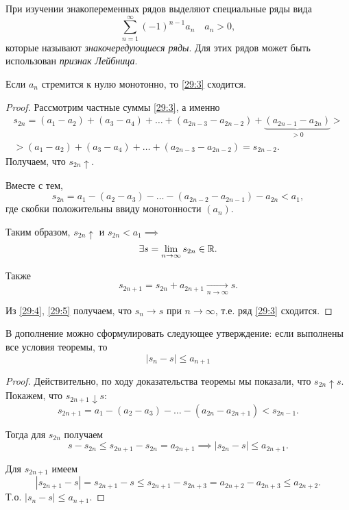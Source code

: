 \documentclass[../../main.tex]{subfiles}
\begin{document}
	При изучении знакопеременных рядов выделяют специальные ряды вида
	\begin{equation}
		\sum_{n = 1}^\infty (-1)^{n - 1}a_n\quad a_n > 0,
		\label{29:3}
	\end{equation}
	которые называют \emph{знакочередующиеся ряды}. Для этих рядов может быть использован \emph{признак Лейбница}.
	\begin{thm}\label{29:leibnitz}
		Если $a_n$ стремится к нулю монотонно, то \eqref{29:3} сходится.
	\end{thm}
	\begin{proof}
		Рассмотрим частные суммы \eqref{29:3}, а именно
		\begin{gather*}
			s_{2n} = (a_1 - a_2) + (a_3 - a_4) + \ldots + (a_{2n - 3} - a_{2n - 2}) + \underbrace{(a_{2n - 1} - a_{2n})}_{> 0} >\\
			> (a_1 - a_2) + (a_3 - a_4) + \ldots + (a_{2n - 3} - a_{2n - 2}) = s_{2n - 2}.
		\end{gather*}
		Получаем, что $s_{2n}\uparrow$.
		
		Вместе с тем,
		\[s_{2n} = a_1 - (a_{2} - a_3) - \ldots - (a_{2n - 2} - a_{2n - 1}) - a_{2n} < a_1,\]
		где скобки положительны ввиду монотонности $(a_n)$.
		
		Таким образом, $s_{2n}\uparrow$ и $s_{2n} < a_1\implies $
		\begin{equation}
			\exists s = \lim\limits_{n\to\infty}s_{2n}\in\mathbb{R}.
			\label{29:4}
		\end{equation}
		
		Также 
		\begin{equation}
			s_{2n + 1} = s_{2n} + a_{2n + 1}\underset{n\to\infty}{\longrightarrow}s.
			\label{29:5}
		\end{equation}
		
		Из \eqref{29:4}, \eqref{29:5} получаем, что $s_n\to s$ при $n\to\infty$, т.е. ряд \eqref{29:3} сходится.
	\end{proof}

	В дополнение можно сформулировать следующее утверждение: если выполнены все условия теоремы, то
	\begin{equation}
		\left|s_n - s\right|\leqslant a_{n + 1}
		\label{29:6}
	\end{equation}
	\begin{proof}
		Действительно, по ходу доказательства теоремы мы показали, что $s_{2n}\uparrow s$. Покажем, что $s_{2n + 1}\downarrow s$:
		\[s_{2n + 1} = a_1 - (a_2 - a_3) - \ldots - (a_{2n} - a_{2n + 1}) < s_{2n - 1}.\]
		
		Тогда для $s_{2n}$ получаем
		\[s - s_{2n} \leqslant s_{2n + 1} - s_{2n} = a_{2n + 1}\implies |s_{2n} - s|\leqslant a_{2n + 1}.\]
		
		Для $s_{2n + 1}$ имеем
		\[|s_{2n + 1} - s| = s_{2n + 1} - s \leqslant s_{2n + 1} - s_{2n + 3} = a_{2n + 2} - a_{2n + 3}\leqslant a_{2n + 2}.\]
		Т.о. $|s_n - s|\leqslant a_{n + 1}$.
	\end{proof}
\end{document}
